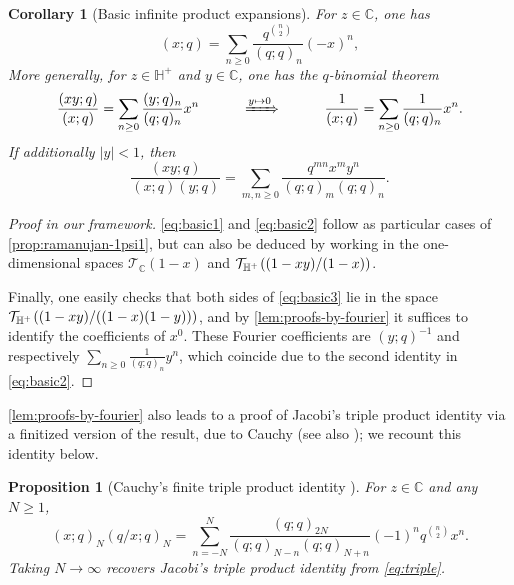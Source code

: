 \documentclass[reqno,11pt]{amsart}
\newtheorem{proposition}[theorem]{Proposition}
\newtheorem{corollary}[theorem]{Corollary}
\theoremstyle{definition}
\theoremstyle{remark}
\numberwithin{equation}{section}
\newcommand{\C}{\mathbb{C}}
\renewcommand{\H}{{\mathbb{H}}}
\newcommand{\Hplus}{{\mathbb{H}^{\textnormal{+}\hspace{-0.03cm}}}}
\newcommand{\mT}{\mathcal{T}}
\begin{document}
\begin{corollary}[Basic infinite product expansions] \label{cor:basic-identities}
For $z \in \C$, one has \cite[p.~19]{andrews1998theory}
\begin{equation} \label{eq:basic1}
(x; q) = \sum_{n \geq 0} \frac{q^{\binom{n}{2}}}{(q; q)_n} (-x)^n,
\end{equation}
More generally, for $z \in \H^+$ and $y \in \C$, one has the $q$-binomial theorem \cite[Theorem 2.4]{andrews1974applications}
\begin{equation} \label{eq:basic2}
    \frac{(xy; q)}{(x; q)} = \sum_{n \geq 0} \frac{(y; q)_n}{(q; q)_n} x^n
    \qquad\quad \xRightarrow{y \mapsto 0}
    \qquad\quad
    \frac{1}{(x; q)} = \sum_{n \geq 0} \frac{1}{(q; q)_n} x^n.
\end{equation} 
If additionally $|y| < 1$, then
\begin{equation} \label{eq:basic3}
    \frac{(xy; q)}{(x; q)(y; q)} 
    =
    \sum_{m, n \ge 0} \frac{q^{mn} x^m y^n}{(q; q)_m (q; q)_n}.
\end{equation}
\end{corollary}


\begin{proof}[Proof in our framework]
\cref{eq:basic1} and \cref{eq:basic2} follow as particular cases of \cref{prop:ramanujan-1psi1}, but can also be deduced by working in the one-dimensional spaces $\mT_\C(1 - x)$ and $\mT_\Hplus \left((1-xy)/(1-x)\right)$.

Finally, one easily checks that both sides of \cref{eq:basic3} lie in the space $\mT_\Hplus\left((1 - xy)/((1 - x)(1 - y))\right)$, and by \cref{lem:proofs-by-fourier} it suffices to identify the coefficients of $x^0$. These Fourier coefficients are $(y; q)^{-1}$ and respectively $\sum_{n \ge 0} \frac{1}{(q; q)_n} y^n$, which coincide due to the second identity in \cref{eq:basic2}.
\end{proof}


\cref{lem:proofs-by-fourier} also leads to a proof of Jacobi's triple product identity via a finitized version of the result, due to Cauchy \cite{cauchy1893second} (see also \cite[(6)]{bressoud1983easy}); we recount this identity below.

\begin{proposition}[Cauchy's finite triple product identity \cite{cauchy1893second}]
\label{prop:Cauchy} %
For $z \in \C$ and any $N \ge 1$,
\[
(x; q)_N \left(q/x; q\right)_N = \sum_{n = -N}^N \frac{(q; q)_{2N}}{(q; q)_{N-n} (q; q)_{N+n}} (-1)^n q^{\binom{n}{2}} x^n.
\]
Taking $N \to \infty$ recovers Jacobi's triple product identity from \cref{eq:triple}.
\end{proposition}
\end{document}
